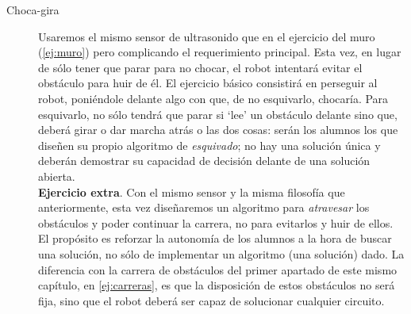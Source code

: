 \begin{description}
\item[Choca-gira]\label{ej:chocaGira}
Usaremos el mismo sensor de ultrasonido que en el ejercicio del muro (\ref{ej:muro}) pero complicando el requerimiento principal. Esta vez, en lugar de sólo tener que parar para no chocar, el robot intentará evitar el obstáculo para huir de él. El ejercicio básico consistirá en perseguir al robot, poniéndole delante algo con que, de no esquivarlo, chocaría. Para esquivarlo, no sólo tendrá que parar si `lee' un obstáculo delante sino que, deberá girar o dar marcha atrás o las dos cosas: serán los alumnos los que diseñen su propio algoritmo de \textit{esquivado}; no hay una solución única y deberán demostrar su capacidad de decisión delante de una solución abierta. \\
\textbf{Ejercicio extra}. Con el mismo sensor y la misma filosofía que anteriormente, esta vez diseñaremos un algoritmo para \textit{atravesar} los obstáculos y poder continuar la carrera, no para evitarlos y huir de ellos. \\
El propósito es reforzar la autonomía de los alumnos a la hora de buscar una solución, no sólo de implementar un algoritmo (una solución) dado. La diferencia con la carrera de obstáculos del primer apartado de este mismo capítulo, en \ref{ej:carreras}, es que la disposición de estos obstáculos no será fija, sino que el robot deberá ser capaz de solucionar cualquier circuito.
\end{description}

